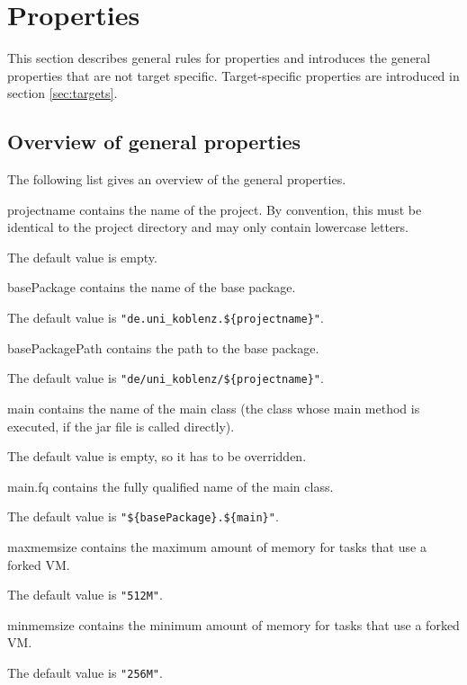 \documentclass[a4paper,twoside,11pt,bibtotoc]{article}
\begin{document}
\section{Properties}
\label{sec:properties}
This section describes general rules for properties and introduces the general properties that are not target specific.
Target-specific properties are introduced in section \ref{sec:targets}.

\subsection{Overview of general properties}
The following list gives an overview of the general properties.
\begin{description*}
	\item[projectname] contains the name of the project. By convention, this must be identical to the project directory and may only contain lowercase letters.\par The default value is empty.
	\item[basePackage] contains the name of the base package.\par The default value is \texttt{"de.uni\_koblenz.\$\{projectname\}"}.
	\item[basePackagePath] contains the path to the base package.\par The default value is \texttt{"de/uni\_koblenz/\$\{projectname\}"}.
	\item[main] contains the name of the main class (the class whose main method is executed, if the jar file is called directly).\par The default value is empty, so it has to be overridden.
	\item[main.fq] contains the fully qualified name of the main class.\par The default value is \texttt{"\$\{basePackage\}.\$\{main\}"}.
	\item[maxmemsize] contains the maximum amount of memory for tasks that use a forked VM.\par The default value is \texttt{"512M"}.
	\item[minmemsize] contains the minimum amount of memory for tasks that use a forked VM.\par The default value is \texttt{"256M"}.
\end{description*}	
\end{document}
